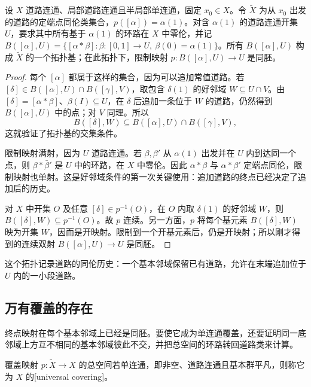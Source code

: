 \begin{lemma}\label{g1:lem:path-class-basis}
	设 \(X\) 道路连通、局部道路连通且半局部单连通，固定 \(x_0\in X\)。令 \(\widetilde X\) 为从 \(x_0\) 出发的道路的定端点同伦类集合，\(p([\alpha])=\alpha(1)\)。对含 \(\alpha(1)\) 的道路连通开集 \(U\)，要求其中所有基于 \(\alpha(1)\) 的环路在 \(X\) 中零伦，并记 \(B([\alpha],U)=\{[\alpha*\beta]:\beta:[0,1]\to U,\ \beta(0)=\alpha(1)\}\)。所有 \(B([\alpha],U)\) 构成 \(\widetilde X\) 的一个拓扑基；在此拓扑下，限制映射 \(p:B([\alpha],U)\to U\) 是同胚。
\end{lemma}
\begin{proof}
	每个 \([\alpha]\) 都属于这样的集合，因为可以追加常值道路。若 \([\delta]\in B([\alpha],U)\cap B([\gamma],V)\)，取包含 \(\delta(1)\) 的好邻域 \(W\subseteq U\cap V\)。由 \([\delta]=[\alpha*\beta]\)、\(\beta(I)\subseteq U\)，在 \(\delta\) 后追加一条位于 \(W\) 的道路，仍然得到 \(B([\alpha],U)\) 中的点；对 \(V\) 同理。所以
	\[
		B([\delta],W)\subseteq B([\alpha],U)\cap B([\gamma],V),
	\]
	这就验证了拓扑基的交集条件。

	限制映射满射，因为 \(U\) 道路连通。若 \(\beta,\beta'\) 从 \(\alpha(1)\) 出发并在 \(U\) 内到达同一个点，则 \(\beta*\bar\beta'\) 是 \(U\) 中的环路，在 \(X\) 中零伦。因此 \(\alpha*\beta\) 与 \(\alpha*\beta'\) 定端点同伦，限制映射也单射。这是好邻域条件的第一次关键使用：追加道路的终点已经决定了追加后的历史。

	对 \(X\) 中开集 \(O\) 及任意 \([\delta]\in p^{-1}(O)\)，在 \(O\) 内取 \(\delta(1)\) 的好邻域 \(W\)，则 \(B([\delta],W)\subseteq p^{-1}(O)\)。故 \(p\) 连续。另一方面，\(p\) 将每个基元素 \(B([\delta],W)\) 映为开集 \(W\)，因而是开映射。限制到一个开基元素后，仍是开映射；所以刚才得到的连续双射 \(B([\alpha],U)\to U\) 是同胚。
\end{proof}

这个拓扑记录道路的同伦历史：一个基本邻域保留已有道路，允许在末端追加位于 \(U\) 内的一小段道路。

\subsection{万有覆盖的存在}
\label{g1:subsec:0504:02}

终点映射在每个基本邻域上已经是同胚。要使它成为单连通覆盖，还要证明同一底邻域上方互不相同的基本邻域彼此不交，并把总空间的环路转回道路类来计算。

\begin{definition}[万有覆盖]\label{g1:def:universal-cover}
	覆盖映射 \(p:\widetilde X\to X\) 的总空间若单连通，即非空、道路连通且基本群平凡，则称它为 \(X\) 的[universal covering]。
\end{definition}

